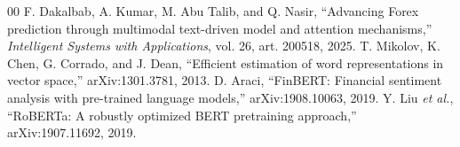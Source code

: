 \begin{thebibliography}{00}
 F. Dakalbab, A. Kumar, M. Abu Talib, and Q. Nasir, ``Advancing Forex prediction through multimodal text-driven model and attention mechanisms,'' \emph{Intelligent Systems with Applications}, vol. 26, art. 200518, 2025.
 T. Mikolov, K. Chen, G. Corrado, and J. Dean, ``Efficient estimation of word representations in vector space,'' arXiv:1301.3781, 2013.
 D. Araci, ``FinBERT: Financial sentiment analysis with pre-trained language models,'' arXiv:1908.10063, 2019.
 Y. Liu \emph{et al.}, ``RoBERTa: A robustly optimized BERT pretraining approach,'' arXiv:1907.11692, 2019.
\end{thebibliography}
